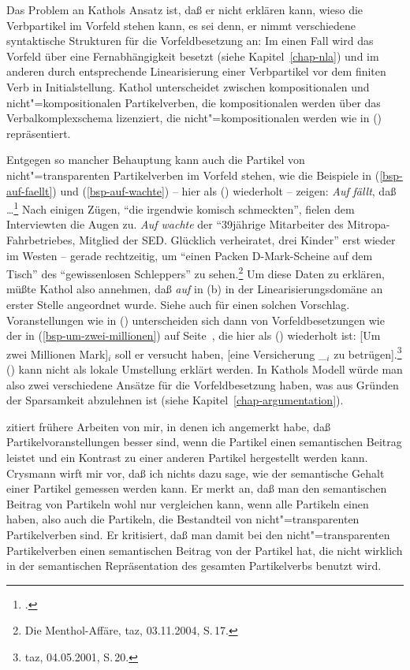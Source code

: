 Das Problem an Kathols Ansatz ist, daß er nicht erklären kann, wieso die Verbpartikel
im Vorfeld stehen kann, es sei denn, er nimmt verschiedene syntaktische Strukturen für die
Vorfeldbesetzung an: Im einen Fall wird das Vorfeld über eine Fernabhängigkeit
besetzt (siehe Kapitel~\ref{chap-nla}) und im anderen durch entsprechende Linearisierung einer
Verbpartikel vor dem finiten Verb in Initialstellung. Kathol unterscheidet zwischen kompositionalen
und nicht"=kompositionalen Partikelverben, die kompositionalen werden über das Verbalkomplexschema
lizenziert, die nicht"=kompositionalen werden wie in () repräsentiert.

Entgegen so mancher Behauptung kann auch die Partikel von nicht"=transparenten Partikelverben im
Vorfeld stehen, wie die Beispiele in (\ref{bsp-auf-faellt}) und (\ref{bsp-auf-wachte}) -- hier als ()
wiederholt -- zeigen:
\eal
\ex{}
\emph{Auf} \emph{fällt}, daß \ldots\footnote{
        .%
}
\ex Nach einigen Zügen, "`die irgendwie komisch schmeckten"', fielen dem Interviewten die Augen zu. 
\emph{Auf wachte} der "`39jährige Mitarbeiter des Mitropa-Fahrbetriebes, Mitglied der SED. Glücklich verheiratet, drei Kinder"'
erst wieder im Westen -- gerade rechtzeitig, um "`einen Packen D-Mark-Scheine auf dem Tisch"' 
des "`gewissenlosen Schleppers"' zu sehen.\footnote{
  Die Menthol-Affäre, taz, 03.11.2004, S.\,17.%
}
\zl
Um diese Daten zu erklären, müßte Kathol also annehmen, daß \emph{auf} in (b)
in der Linearisierungsdomäne an erster Stelle angeordnet wurde. Siehe auch 
für einen solchen Vorschlag.
Voranstellungen wie in () unterscheiden sich dann von Vorfeldbesetzungen wie der in 
(\ref{bsp-um-zwei-millionen}) auf Seite~\pageref{bsp-um-zwei-millionen},
die hier als () wiederholt ist:
\ea\label{bsp-um-zwei-millionen-zwei}
{}[Um zwei Millionen Mark]$_i$ soll er versucht haben, [eine Versicherung \_$_i$ zu betrügen].\footnote{
         taz, 04.05.2001, S.\,20.
}
\z
() kann nicht als lokale Umstellung erklärt werden.
In Kathols Modell würde man also zwei verschiedene Ansätze für die Vorfeldbesetzung haben,
was aus Gründen der Sparsamkeit abzulehnen ist (siehe Kapitel~\ref{chap-argumentation}).

\citet[Kapitel~4.2]{Crysmann2002a} zitiert frühere Arbeiten von mir, in denen ich angemerkt
habe, daß Partikelvoranstellungen besser sind, wenn die Partikel einen semantischen
Beitrag leistet und ein Kontrast zu einer anderen Partikel hergestellt werden kann.
\eal
{}
\zl
Crysmann wirft mir vor, daß ich nichts dazu sage, wie der semantische
Gehalt einer Partikel gemessen werden kann. Er merkt an, daß man den semantischen
Beitrag von Partikeln wohl nur vergleichen kann, wenn alle Partikeln einen
\contw haben, also auch die Partikeln, die Bestandteil von nicht"=transparenten
Partikelverben sind. Er kritisiert, daß man damit bei den nicht"=transparenten
Partikelverben einen semantischen Beitrag von der Partikel hat, die nicht wirklich
in der semantischen Repräsentation des gesamten Partikelverbs benutzt wird. 


